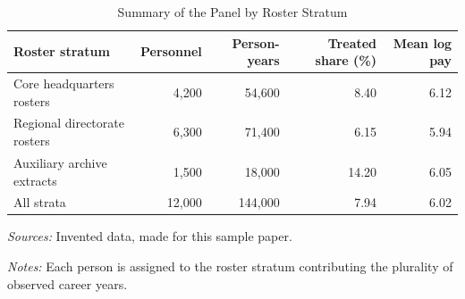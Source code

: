 \begin{table}[!htbp]
\centering
\caption{Summary of the Panel by Roster Stratum}\label{tab:summary}
\begin{threeparttable}
\footnotesize
\setlength{\tabcolsep}{6pt}
\begin{tabular}{l rrrr}
\toprule
Roster stratum & Personnel & Person-years & Treated share (\%) & Mean log pay \\
\midrule
Core headquarters rosters     & 4,200 &  54,600 &  8.40 & 6.12 \\
Regional directorate rosters  & 6,300 &  71,400 &  6.15 & 5.94 \\
Auxiliary archive extracts    & 1,500 &  18,000 & 14.20 & 6.05 \\
\addlinespace
All strata                    & 12,000 & 144,000 &  7.94 & 6.02 \\
\bottomrule
\end{tabular}
\begin{ecofintablenotes}
\item \textit{Sources:} Invented data, made for this sample paper.
\item \textit{Notes:} Each person is assigned to the roster stratum contributing the plurality of observed career years.
\end{ecofintablenotes}
\end{threeparttable}
\end{table}
